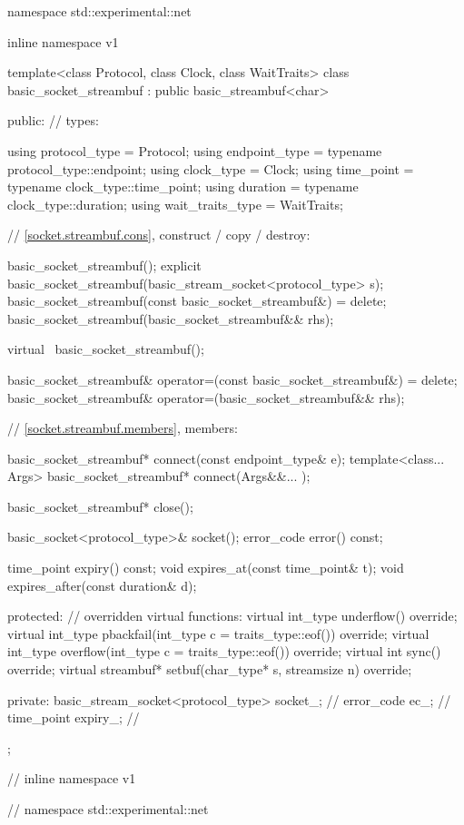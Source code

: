 \begin{codeblock}
namespace std::experimental::net {
inline namespace v1 {

  template<class Protocol, class Clock, class WaitTraits>
  class basic_socket_streambuf : public basic_streambuf<char>
  {
  public:
    // types:

    using protocol_type = Protocol;
    using endpoint_type = typename protocol_type::endpoint;
    using clock_type = Clock;
    using time_point = typename clock_type::time_point;
    using duration = typename clock_type::duration;
    using wait_traits_type = WaitTraits;

    // \ref{socket.streambuf.cons}, construct / copy / destroy:

    basic_socket_streambuf();
    explicit basic_socket_streambuf(basic_stream_socket<protocol_type> s);
    basic_socket_streambuf(const basic_socket_streambuf&) = delete;
    basic_socket_streambuf(basic_socket_streambuf&& rhs);

    virtual ~basic_socket_streambuf();

    basic_socket_streambuf& operator=(const basic_socket_streambuf&) = delete;
    basic_socket_streambuf& operator=(basic_socket_streambuf&& rhs);

    // \ref{socket.streambuf.members}, members:

    basic_socket_streambuf* connect(const endpoint_type& e);
    template<class... Args> basic_socket_streambuf* connect(Args&&... );

    basic_socket_streambuf* close();

    basic_socket<protocol_type>& socket();
    error_code error() const;

    time_point expiry() const;
    void expires_at(const time_point& t);
    void expires_after(const duration& d);

  protected:
    // overridden virtual functions:
    virtual int_type underflow() override;
    virtual int_type pbackfail(int_type c = traits_type::eof()) override;
    virtual int_type overflow(int_type c = traits_type::eof()) override;
    virtual int sync() override;
    virtual streambuf* setbuf(char_type* s, streamsize n) override;

  private:
    basic_stream_socket<protocol_type> socket_; // \expos
    error_code ec_; // \expos
    time_point expiry_; // \expos
  };

} // inline namespace v1
} // namespace std::experimental::net
\end{codeblock}

